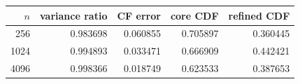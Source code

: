 \begin{tabular}{@{}rrrrr@{}}
\toprule
$n$ & variance ratio & CF error & core CDF & refined CDF \\
\midrule
256 & 0.983698 & 0.060855 & 0.705897 & 0.360445 \\
1024 & 0.994893 & 0.033471 & 0.666909 & 0.442421 \\
4096 & 0.998366 & 0.018749 & 0.623533 & 0.387653 \\
\bottomrule
\end{tabular}
